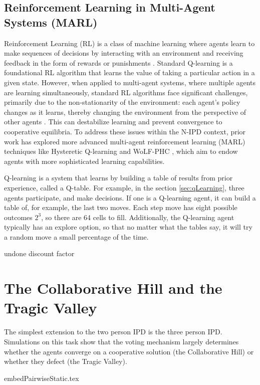 \documentclass[]{llncs} %
\begin{document}
\subsection{Reinforcement Learning in Multi-Agent Systems (MARL)}
Reinforcement Learning (RL) is a class of machine learning where
agents learn to make sequences of decisions by interacting with an
environment and receiving feedback in the form of rewards or
punishments \cite{SuttonBarto1998}.  Standard Q-learning is a
foundational RL algorithm that learns the value of taking a particular
action in a given state. However, when applied to multi-agent
systems, where multiple agents are learning simultaneously, standard
RL algorithms face significant challenges, primarily due to the
non-stationarity of the environment: each agent's policy changes as it
learns, thereby changing the environment from the perspective of other
agents \cite{Busoniu2008}.  This can destabilize learning and prevent
convergence to cooperative equilibria. To address these issues within
the N-IPD context, prior work has explored more advanced multi-agent
reinforcement learning (MARL) techniques like Hysteretic Q-learning
\cite{Matignon} and WoLF-PHC \cite{Bowling},
which aim to endow agents with more sophisticated learning
capabilities. 

Q-learning \cite {Watkins} is a system that learns by building a table
of results from prior experience, called a Q-table.  For example, in
the section \ref {sec:qLearning}, three agents participate, and make
decisions.  If one is a Q-learning agent, it can build a table of, for
example, the last two moves.  Each step move has eight possible
outcomes $2^3$, so there are 64 cells to fill.  Additionally, the
Q-learning agent typically has an explore option, so that no matter
what the tables say, it will try a random move a small percentage of
the time.

undone discount factor


\section{The Collaborative Hill and the Tragic Valley}
\label{sec:tragicValley}

The simplest extension to the two person IPD is the three person IPD.
Simulations on this task show that the voting mechanism largely determines
whether the agents converge on a cooperative solution (the Collaborative
Hill) or whether they defect (the Tragic Valley).

 {embedPairwiseStatic.tex}
\end{document}
